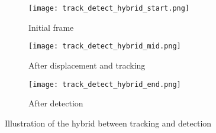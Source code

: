 \begin{figure}[H]
\centering
\begin{subfigure}{.33\textwidth}
  \centering
  \texttt{[image: track\_detect\_hybrid\_start.png]}
  \caption{Initial frame}
  \label{fig:trackdetecthybrid_a}
\end{subfigure}%
\begin{subfigure}{.33\textwidth}
  \centering
  \texttt{[image: track\_detect\_hybrid\_mid.png]}
  \caption{After displacement and tracking}
  \label{fig:trackdetecthybrid_b}
\end{subfigure}
\begin{subfigure}{.33\textwidth}
  \centering
  \texttt{[image: track\_detect\_hybrid\_end.png]}
  \caption{After detection}
  \label{fig:trackdetecthybrid_c}
\end{subfigure}
\caption{Illustration of the hybrid between tracking and detection}
\label{fig:trackdetecthybrid}
\end{figure}


